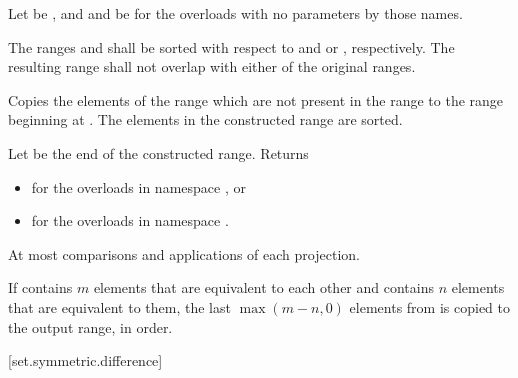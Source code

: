 \begin{itemdescr}
\pnum
Let  be ,
and  and  be 
for the overloads with no parameters by those names.

\pnum
\requires
The ranges  and  shall be
sorted with respect to  and
 or , respectively.
The resulting range shall not overlap with either of the original ranges.

\pnum
\effects
Copies the elements of the range
which are not present in the range
to the range beginning at
.
The elements in the constructed range are sorted.

\pnum
\returns
Let  be the end of the constructed range.
Returns
\begin{itemize}
\item {} for the overloads in namespace , or
\item {} for the overloads in
  namespace .
\end{itemize}

\pnum
\complexity
At most
comparisons and applications of each projection.

\pnum
\remarks
If
contains $m$
elements that are equivalent to each other and
contains $n$
elements that are equivalent to them, the last
$\max(m - n, 0)$
elements from
is copied to the output range, in order.
\end{itemdescr}

[set.symmetric.difference]{}


